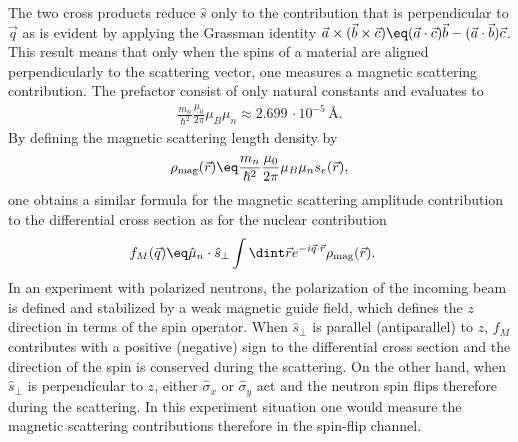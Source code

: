 \documentclass[\main/dresen_thesis.tex]{subfiles}
\begin{document}
The two cross products reduce $\hat{s}$ only to the contribution that is perpendicular to $\vec{q}$ as is evident by applying the Grassman identity $\vec{a} \times (\vec{b} \times \vec{c}) \eq (\vec{a} \cdot \vec{c}) \vec{b} - (\vec{a} \cdot \vec{b}) \vec{c}$.
This result means that only when the spins of a material are aligned perpendicularly to the scattering vector, one measures a magnetic scattering contribution.
The prefactor consist of only natural constants and evaluates to
\begin{align}
  \frac{m_n}{\hbar^2}  \frac{\mu_0}{2\pi} \mu_B \mu_n \approx 2.699\,\cdot 10^{-5} \,\unit{\angstrom}.
\end{align}
By defining the magnetic scattering length density by
\begin{align}
  \rho_\mathrm{mag} (\vec{r}) \eq \frac{m_n}{\hbar^2}  \frac{\mu_0}{2\pi} \mu_B \mu_n s_e (\vec{r}),
\end{align}
one obtains a similar formula for the magnetic scattering amplitude contribution to the differential cross section as for the nuclear contribution
\begin{align}
  f_M (\vec{q}) \eq & \hat{\mu}_n \cdot \hat{s}_\perp \int \dint \vec{r} e^{- i \vec{q} \cdot \vec{r}} \rho_\mathrm{mag}(\vec{r}).
\end{align}
In an experiment with polarized neutrons, the polarization of the incoming beam is defined and stabilized by a weak magnetic guide field, which defines the $z$ direction in terms of the spin operator.
When $\hat{s}_\perp$ is parallel (antiparallel) to $z$, $f_M$ contributes with a positive (negative) sign to the differential cross section and the direction of the spin is conserved during the scattering.
On the other hand, when $\hat{s}_\perp$ is perpendicular to $z$, either $\hat{\sigma}_x$ or $\hat{\sigma}_y$ act and the neutron spin flips therefore during the scattering.
In this experiment situation one would measure the magnetic scattering contributions therefore in the spin-flip channel.
\end{document}
